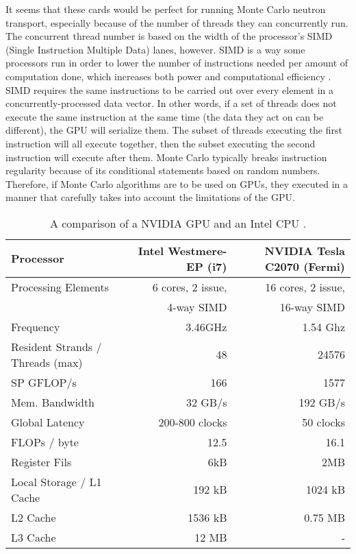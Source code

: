 It seems that these cards would be perfect for running Monte Carlo neutron transport, especially because of the number of threads they can concurrently run.  The concurrent thread number is based on the width of the processor's SIMD (Single Instruction Multiple Data) lanes, however.  SIMD is a way some processors run in order to lower the number of instructions needed per amount of computation done, which increases both power and computational efficiency \cite{simd_power}.  SIMD requires the same instructions to be carried out over every element  in a concurrently-processed data vector.  In other words, if a set of threads does not execute the same instruction at the same time (the data they act on can be different), the GPU will serialize them.  The subset of threads executing the first instruction will all execute together, then the subset executing the second instruction will execute after them.  Monte Carlo typically breaks instruction regularity because of its conditional statements based on random numbers.  Therefore, if Monte Carlo algorithms are to be used on GPUs, they executed in a manner that carefully takes into account the limitations of the GPU.

\begin{table}[h]
\centering
\caption{A comparison of a NVIDIA GPU and an Intel CPU \cite{cent, cpu_latency}.}
\label{gpu_cpu_comp}
\begin{tabular}{| l | r | r |}
\hline
Processor & Intel Westmere-EP (i7) & NVIDIA Tesla C2070 (Fermi) \\
\hline
\hline
Processing Elements & 6 cores, 2 issue, & 16 cores, 2 issue, \\
& 4-way SIMD &  16-way SIMD  \\
\hline
Frequency & 3.46GHz &  1.54 Ghz \\
\hline
Resident Strands / Threads (max) & 48 & 24576 \\
\hline
SP GFLOP/s & 166 & 1577 \\
\hline
Mem. Bandwidth &  32 GB/s & 192 GB/s \\
\hline
Global Latency & 200-800 clocks & ~50 clocks \\
\hline
FLOPs / byte & 12.5  & 16.1 \\
\hline
Register Fils & 6kB & 2MB \\
\hline
Local Storage / L1 Cache & 192 kB & 1024 kB \\
\hline
L2 Cache & 1536 kB & 0.75 MB \\
\hline
L3 Cache & 12 MB & - \\
\hline
\end{tabular}
\end{table}

